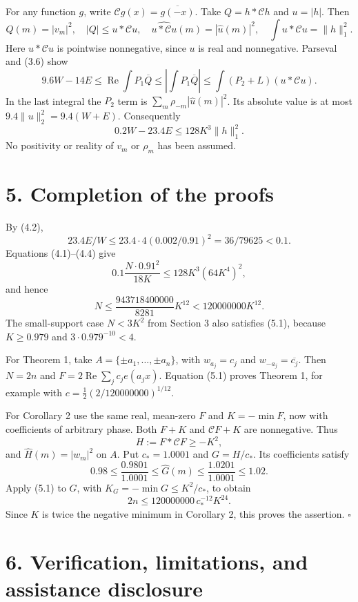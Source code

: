 \documentclass[11pt]{article}
\begin{document}
For any function \(g\), write \(\mathcal Cg(x)=\overline{g(-x)}\). Take \(Q=h*\mathcal Ch\) and \(u=|h|\). Then
\[
\widehat Q(m)=|v_m|^2,\quad |Q|\leq u*\mathcal Cu,\quad
\widehat{u*\mathcal Cu}(m)=|\widehat u(m)|^2,\quad
\int u*\mathcal Cu=\|h\|_1^2.
\tag{4.3}
\]
Here \(u*\mathcal Cu\) is pointwise nonnegative, since \(u\) is real and nonnegative. Parseval and (3.6) show
\[
9.6W-14E\leq\operatorname{Re}\int P_1\overline Q
\leq\left|\int P_1\overline Q\right|
\leq\int(P_2+L)(u*\mathcal Cu).
\]
In the last integral the \(P_2\) term is \(\sum_m\rho_{-m}|\widehat u(m)|^2\). Its absolute value is at most \(9.4\|u\|_2^2=9.4(W+E)\). Consequently
\[
0.2W-23.4E\leq128K^3\|h\|_1^2.
\tag{4.4}
\]
No positivity or reality of \(v_m\) or \(\rho_m\) has been assumed.

\section*{5. Completion of the proofs}

By (4.2),
\[
23.4E/W\leq23.4\cdot4(0.002/0.91)^2
=36/79625<0.1.
\]
Equations (4.1)--(4.4) give
\[
0.1\frac{N\cdot0.91^2}{18K}\leq128K^3(64K^4)^2,
\]
and hence
\[
N\leq\frac{943718400000}{8281}K^{12}<120000000K^{12}.
\tag{5.1}
\]
The small-support case \(N<3K^2\) from Section 3 also satisfies (5.1), because \(K\geq0.979\) and \(3\cdot0.979^{-10}<4\).

For Theorem 1, take \(A=\{\pm a_1,\ldots,\pm a_n\}\), with \(w_{a_j}=c_j\) and \(w_{-a_j}=\overline{c_j}\). Then \(N=2n\) and \(F=2\operatorname{Re}\sum_jc_je(a_jx)\). Equation (5.1) proves Theorem 1, for example with \(c=\tfrac12(2/120000000)^{1/12}\).

For Corollary 2 use the same real, mean-zero \(F\) and \(K=-\min F\), now with coefficients of arbitrary phase. Both \(F+K\) and \(\mathcal CF+K\) are nonnegative. Thus
\[
H:=F*\mathcal CF\geq-K^2,
\]
and \(\widehat H(m)=|w_m|^2\) on \(A\). Put \(c_*=1.0001\) and \(G=H/c_*\). Its coefficients satisfy
\[
0.98\leq\frac{0.9801}{1.0001}\leq\widehat G(m)
\leq\frac{1.0201}{1.0001}\leq1.02.
\]
Apply (5.1) to \(G\), with \(K_G=-\min G\leq K^2/c_*\), to obtain
\[
2n\leq120000000\,c_*^{-12}K^{24}.
\]
Since \(K\) is twice the negative minimum in Corollary 2, this proves the assertion. \(\square\)

\section*{6. Verification, limitations, and assistance disclosure}
\end{document}
